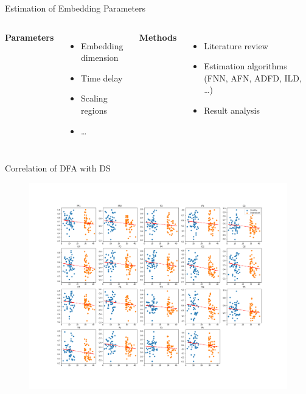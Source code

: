 \documentclass{beamer}
\begin{document}
\begin{frame}[t]{Estimation of Embedding Parameters}
  \begin{columns}
    \textbf{Parameters}
      \begin{itemize}
        \item Embedding dimension
        \item Time delay
        \item Scaling regions
        \item \ldots
      \end{itemize}

    \textbf{Methods}
      \begin{itemize}
        \item Literature review
        \item Estimation algorithms (FNN, AFN, ADFD, ILD, \ldots)
        \item Result analysis
      \end{itemize}
  \end{columns}
  \vfill
\end{frame}


\begin{frame}[noframenumbering]{Correlation of DFA with DS}
  \centering
  \begin{figure}[tbp]
    \centering
    \includegraphics[width=\linewidth]{../Images/dists/dfadepcorr.png}
  \end{figure}
\end{frame}
\end{document}
